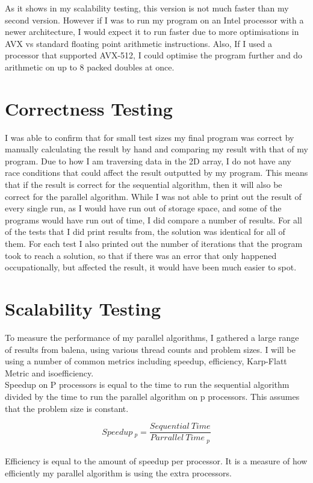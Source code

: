\documentclass{report}
\begin{document}
As it shows in my scalability testing, this version is not much faster than my second version. However if I was to run my program on an Intel processor with a newer architecture, I would expect it to run faster due to more optimisations in AVX vs standard floating point arithmetic instructions. Also, If I used a processor that supported AVX-512, I could optimise the program further and do arithmetic on up to 8 packed doubles at once.
\chapter{Correctness Testing}
I was able to confirm that for small test sizes my final program was correct by manually calculating the result by hand and comparing my result with that of my program. Due to how I am traversing data in the 2D array, I do not have any race conditions that could affect the result outputted by my program. This means that if the result is correct for the sequential algorithm, then it will also be correct for the parallel algorithm.
While I was not able to print out the result of every single run, as I would have run out of storage space, and some of the programs would have run out of time, I did compare a number of results. For all of the tests that I did print results from, the solution was identical for all of them. For each test I also printed out the number of iterations that the program took to reach a solution, so that if there was an error that only happened occupationally, but affected the result, it would have been much easier to spot.
\chapter{Scalability Testing}
To measure the performance of my parallel algorithms, I gathered a large range of results from balena, using various thread counts and problem sizes. I will be using a number of common metrics including speedup, efficiency, Karp-Flatt Metric and isoefficiency.\\

Speedup on P processors is equal to the time to run the sequential algorithm divided by the time to run the parallel algorithm on p processors. This assumes that the problem size is constant.

$$Speedup\ _p=\frac{Sequential\ Time}{Parrallel\ Time\ _p}$$\\

Efficiency is equal to the amount of speedup per processor. It is a measure of how efficiently my parallel algorithm is using the extra processors.
\end{document}
